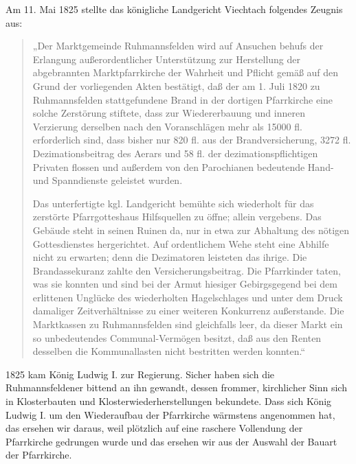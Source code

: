 \documentclass[12pt,a4paper]{book}
\begin{document}
Am 11. Mai 1825 stellte das königliche Landgericht Viechtach folgendes
Zeugnis aus:

\begin{quote}
„Der Marktgemeinde Ruhmannsfelden wird auf Ansuchen behufs der Erlangung
außerordentlicher Unterstützung zur Herstellung der abgebrannten
Marktpfarrkirche der Wahrheit und Pflicht gemäß auf den Grund der
vorliegenden Akten bestätigt, daß der am 1. Juli 1820 zu Ruhmannsfelden
stattgefundene Brand in der dortigen Pfarrkirche eine solche Zerstörung
stiftete, dass zur Wiedererbauung und inneren Verzierung derselben nach
den Voranschlägen mehr als 15000 fl. erforderlich sind, dass bisher nur
820 fl. aus der Brandversicherung, 3272 fl. Dezimationsbeitrag des
Aerars und 58 fl. der dezimationspflichtigen Privaten flossen und
außerdem von den Parochianen bedeutende Hand- und Spanndienste geleistet
wurden.

Das unterfertigte kgl. Landgericht bemühte sich wiederholt für das
zerstörte Pfarrgotteshaus Hilfsquellen zu öffne; allein vergebens. Das
Gebäude steht in seinen Ruinen da, nur in etwa zur Abhaltung des nötigen
Gottesdienstes hergerichtet. Auf ordentlichem Wehe steht eine Abhilfe
nicht zu erwarten; denn die Dezimatoren leisteten das ihrige. Die
Brandassekuranz zahlte den Versicherungsbeitrag. Die Pfarrkinder taten,
was sie konnten und sind bei der Armut hiesiger Gebirgsgegend bei dem
erlittenen Unglücke des wiederholten Hagelschlages und unter dem Druck
damaliger Zeitverhältnisse zu einer weiteren Konkurrenz außerstande. Die
Marktkassen zu Ruhmannsfelden sind gleichfalls leer, da dieser Markt ein
so unbedeutendes Communal-Vermögen besitzt, daß aus den Renten desselben
die Kommunallasten nicht bestritten werden konnten.“
\end{quote}

1825 kam König Ludwig I. zur Regierung. Sicher haben sich die
Ruhmannsfeldener bittend an ihn gewandt, dessen frommer, kirchlicher
Sinn sich in Klosterbauten und Klosterwiederherstellungen bekundete.
Dass sich König Ludwig I. um den Wiederaufbau der Pfarrkirche wärmstens
angenommen hat, das ersehen wir daraus, weil plötzlich auf eine raschere
Vollendung der Pfarrkirche gedrungen wurde und das ersehen wir aus der
Auswahl der Bauart der Pfarrkirche.
\end{document}
